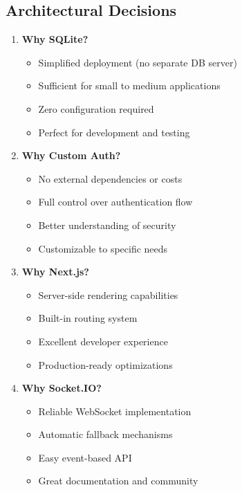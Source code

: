 \documentclass[11pt,a4paper]{article}
\begin{document}
\subsection{Architectural Decisions}
\begin{enumerate}[leftmargin=*]
    \item \textbf{Why SQLite?} 
    \begin{itemize}
        \item Simplified deployment (no separate DB server)
        \item Sufficient for small to medium applications
        \item Zero configuration required
        \item Perfect for development and testing
    \end{itemize}
    
    \item \textbf{Why Custom Auth?}
    \begin{itemize}
        \item No external dependencies or costs
        \item Full control over authentication flow
        \item Better understanding of security
        \item Customizable to specific needs
    \end{itemize}
    
    \item \textbf{Why Next.js?}
    \begin{itemize}
        \item Server-side rendering capabilities
        \item Built-in routing system
        \item Excellent developer experience
        \item Production-ready optimizations
    \end{itemize}
    
    \item \textbf{Why Socket.IO?}
    \begin{itemize}
        \item Reliable WebSocket implementation
        \item Automatic fallback mechanisms
        \item Easy event-based API
        \item Great documentation and community
    \end{itemize}
\end{enumerate}
\end{document}

